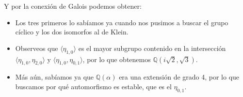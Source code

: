 \begin{ejemplo}
\begin{figure}[H]
    \end{figure}
    \noindent
    Y por la conexión de Galois podemos obtener:
    \begin{itemize}
        \item Los tres primeros lo sabíamos ya cuando nos pusimos a buscar el grupo cíclico y los dos isomorfos al de Klein.
        \item Observeos que $\langle \eta_{1,0} \rangle $ es el mayor subgrupo contenido en la intersección $\langle \eta_{1,0},\eta_{2,0} \rangle $ y $\langle \eta_{1,0},\eta_{0,1} \rangle $, por lo que obtenemos $\mathbb{Q}(i\sqrt{2},\sqrt{3})$.
        \item Más aún, sabíamos ya que $\mathbb{Q}(\alpha)$ era una extensión de grado 4, por lo que buscamos por qué automorfismo es estable, que es el $\eta_{0,1}$.


\end{itemize}
\end{ejemplo}
